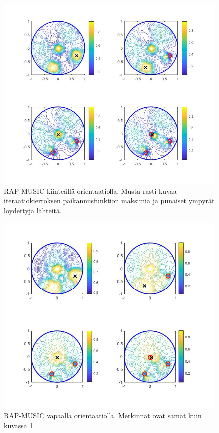 \clearpage

\begin{figure}
    \centering
    \includegraphics[width=\textwidth]{RAPfixed.jpg}
    \caption{RAP-MUSIC kiinteällä orientaatiolla. Musta rasti kuvaa iteraatiokierroksen paikannusfunktion maksimia ja punaiset ympyrät löydettyjä lähteitä.}
    \label{fig:RAPfix}
\end{figure}

\clearpage
\begin{figure}
    \centering
    \includegraphics[width=\textwidth]{RAPfree.jpg}
    \caption{RAP-MUSIC vapaalla orientaatiolla. Merkinnät ovat samat kuin kuvassa \ref{fig:RAPfix}.}
    \label{fig:RAPfree}
\end{figure}

